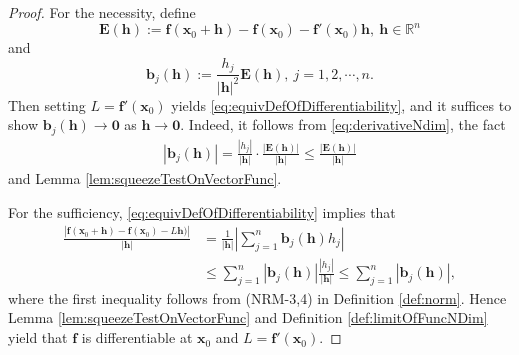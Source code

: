 \begin{proof}
  For the necessity, define
  \begin{displaymath}
    \mathbf{E}(\mathbf{h}):=\mathbf{f}(\mathbf{x}_{0}+\mathbf{h})
    -\mathbf{f}(\mathbf{x}_{0})-\mathbf{f}'(\mathbf{x}_{0})\mathbf{h},
    \ \mathbf{h}\in \mathbb{R}^{n}
  \end{displaymath}
  and
  \begin{displaymath}
    \mathbf{b}_{j}(\mathbf{h})
    :=\frac{h_{j}}{|\mathbf{h}|^{2}}\mathbf{E}(\mathbf{h}),\
    j=1,2,\cdots,n.
  \end{displaymath}
  Then setting $L=\mathbf{f}'(\mathbf{x}_{0})$ yields
  \eqref{eq:equivDefOfDifferentiability}, and
  it suffices to show
  $\mathbf{b}_{j}(\mathbf{h})\rightarrow \mathbf{0}$ as
  $\mathbf{h}\rightarrow \mathbf{0}$. Indeed, it follows from
  \eqref{eq:derivativeNdim}, the fact
  \begin{align*}
    |\mathbf{b}_{j}(\mathbf{h})|=\frac{|h_{j}|}{|\mathbf{h}|}
    \cdot \frac{|\mathbf{E}(\mathbf{h})|}{|\mathbf{h}|}
    \le \frac{|\mathbf{E}(\mathbf{h})|}{|\mathbf{h}|}
  \end{align*}
  and Lemma \ref{lem:squeezeTestOnVectorFunc}.

  For the sufficiency, \eqref{eq:equivDefOfDifferentiability} implies
  that
  \begin{align*}
    \frac{|\mathbf{f}(\mathbf{x}_{0}+\mathbf{h})
    -\mathbf{f}(\mathbf{x}_{0})-L\mathbf{h})|}{|\mathbf{h}|}
    &=\frac{1}{|\mathbf{h}|}
    \left|\sum_{j=1}^{n}\mathbf{b}_{j}(\mathbf{h})h_{j}\right|\\
    &\le  \sum_{j=1}^{n}|\mathbf{b}_{j}(\mathbf{h})|
      \frac{|h_{j}|}{|\mathbf{h}|}
     \le \sum_{j=1}^{n}|\mathbf{b}_{j}(\mathbf{h})|,
  \end{align*}
  where the first inequality follows from
  (NRM-3,4) in Definition \ref{def:norm}.
  Hence Lemma \ref{lem:squeezeTestOnVectorFunc} and
  Definition \ref{def:limitOfFuncNDim} yield that
  $\mathbf{f}$ is differentiable at $\mathbf{x}_{0}$ and
  $L=\mathbf{f}'(\mathbf{x}_{0})$.
\end{proof}

